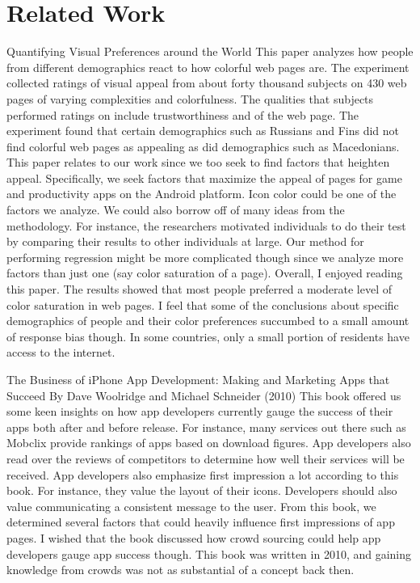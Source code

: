 \section{Related Work}

Quantifying Visual Preferences around the World
This paper analyzes how people from different demographics react to how colorful web pages are. The experiment collected ratings of visual appeal from about forty thousand subjects on 430 web pages of varying complexities and colorfulness. The qualities that subjects performed ratings on include trustworthiness and  of the web page. The experiment found that certain demographics such as Russians and Fins did not find colorful web pages as appealing as did demographics such as Macedonians.
This paper relates to our work since we too seek to find factors that heighten appeal. Specifically, we seek factors that maximize the appeal of pages for game and productivity apps on the Android platform. Icon color could be one of the factors we analyze. We could also borrow off of many ideas from the methodology. For instance, the researchers motivated individuals to do their test by comparing their results to other individuals at large. Our method for performing regression might be more complicated though since we analyze more factors than just one (say color saturation of a page).
Overall, I enjoyed reading this paper. The results showed that most people preferred a moderate level of color saturation in web pages. I feel that some of the conclusions about specific demographics of people and their color preferences succumbed to a small amount of response bias though. In some countries, only a small portion of residents have access to the internet.

The Business of iPhone App Development: Making and Marketing Apps that Succeed
By Dave Woolridge and Michael Schneider (2010)
This book offered us some keen insights on how app developers currently gauge the success of their apps both after and before release. For instance, many services out there such as Mobclix provide rankings of apps based on download figures. App developers also read over the reviews of competitors to determine how well their services will be received.
App developers also emphasize first impression a lot according to this book. For instance, they value the layout of their icons. Developers should also value communicating a consistent message to the user. From this book, we determined several factors that could heavily influence first impressions of app pages. I wished that the book discussed how crowd sourcing could help app developers gauge app success though. This book was written in 2010, and gaining knowledge from crowds was not as substantial of a concept back then.

